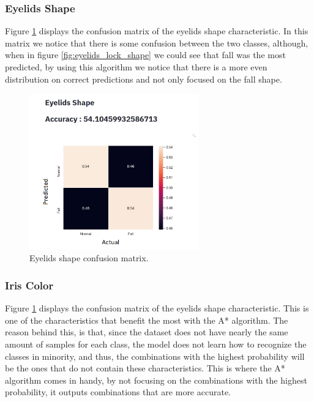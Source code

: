 \documentclass[12pt,a4paper,oneside]{memoir}
\begin{document}
\subsubsection{Eyelids Shape}
Figure \ref{fig:eyelids_star_shape} displays the confusion matrix of the eyelids shape characteristic. In this matrix we notice that there is some confusion between the two classes, although, when in figure \ref{fig:eyelids_lock_shape} we could see that fall was the most predicted, by using this algorithm we notice that there is a more even distribution on correct predictions and not only focused on the fall shape.


\begin{figure}[H]
\centering
\includegraphics[width=0.65\textwidth]{images/eyelids_star_shape.png}
\caption{Eyelids shape confusion matrix.}
\centering
\label{fig:eyelids_star_shape}
\end{figure}



\subsubsection{Iris Color}
Figure \ref{fig:eyelids_star_shape} displays the confusion matrix of the eyelids shape characteristic. This is one of the characteristics that benefit the most with the A* algorithm. The reason behind this, is that, since the dataset does not have nearly the same amount of samples for each class, the model does not learn how to recognize the classes in minority, and thus, the combinations with the highest probability will be the ones that do not contain these characteristics. This is where the A* algorithm comes in handy, by not focusing on the combinations with the highest probability, it outputs combinations that are more accurate. 
\end{document}
